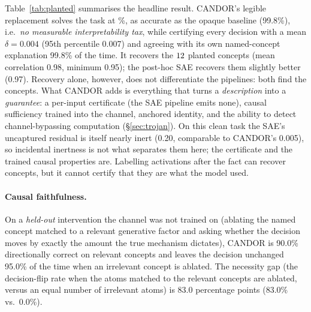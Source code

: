 \documentclass[11pt]{article}
\providecommand{\opaqueAcc}{99.8}\providecommand{\taxPct}{0.00}
\providecommand{\deltaMain}{0.004}\providecommand{\deltaMainPct}{0.40}
\providecommand{\deltaPNineFive}{0.007}\providecommand{\agreeMain}{99.8}
\providecommand{\recovery}{0.98}\providecommand{\recoveryMin}{0.95}\providecommand{\monoMargin}{0.50}
\providecommand{\necGap}{83.0}\providecommand{\necRel}{83.0}\providecommand{\necIrrel}{0.0}
\providecommand{\dirRel}{90.0}\providecommand{\dirIrrel}{95.0}
\providecommand{\leakSwapCandor}{0.005}
\providecommand{\saeRecovery}{0.97}\providecommand{\saeSubDelta}{0.02}
\providecommand{\saeResidualSwap}{0.20}\providecommand{\residualSwapRatio}{40}
\begin{document}
Table~\ref{tab:planted} summarises the headline result. CANDOR's legible replacement
solves the task at \candorLegible\%, as accurate as the opaque baseline (\opaqueAcc\%),
i.e.\ \emph{no measurable interpretability tax}, while certifying every decision with a
mean $\delta=\deltaMain{}$ (95th percentile \deltaPNineFive{}) and agreeing with its
own named-concept explanation \agreeMain\% of the time. It recovers the $12$
planted concepts (mean correlation \recovery{}, minimum \recoveryMin{}); the post-hoc
SAE recovers them slightly better (\saeRecovery{}). Recovery alone, however, does not
differentiate the pipelines: both find the concepts. What CANDOR adds is everything
that turns a \emph{description} into a
\emph{guarantee}: a per-input certificate (the SAE pipeline emits none), causal
sufficiency trained into the channel, anchored identity, and the ability to detect
channel-bypassing computation (\S\ref{sec:trojan}). On this clean task the SAE's
uncaptured residual is itself nearly inert (\saeResidualSwap{}, comparable to CANDOR's
\leakSwapCandor{}), so incidental inertness is not what separates them here; the
certificate and the trained causal properties are. Labelling activations after the fact
can recover concepts, but it cannot certify that they are what the model used.

\paragraph{Causal faithfulness.} On a \emph{held-out} intervention the channel was not
trained on (ablating the named concept matched to a relevant generative factor and
asking whether the decision moves by exactly the amount the true mechanism dictates),
CANDOR is \dirRel\% directionally correct on relevant concepts and leaves the decision
unchanged \dirIrrel\% of the time when an irrelevant concept is ablated. The necessity
gap (the decision-flip rate when the atoms matched to the relevant concepts are ablated,
versus an equal number of irrelevant atoms) is
\necGap{} percentage points (\necRel\% vs.\ \necIrrel\%).
\end{document}
